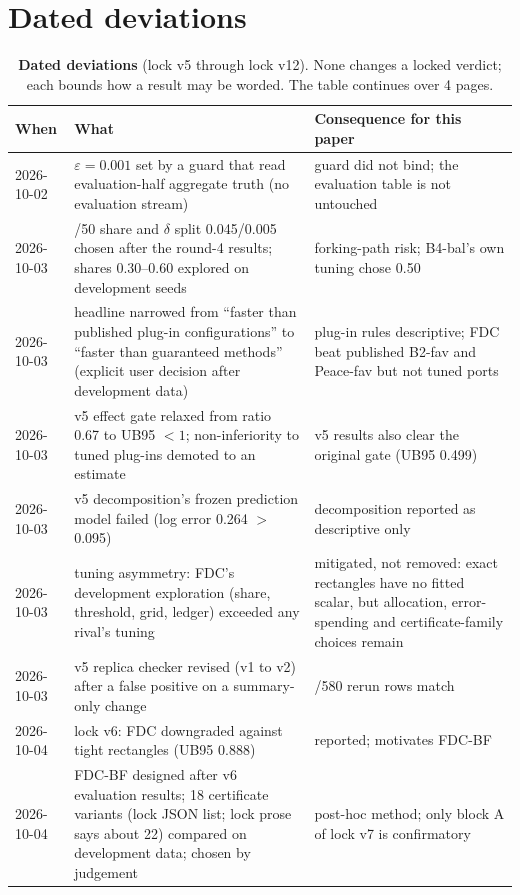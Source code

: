 \documentclass[sigconf,anonymous,review]{acmart}
\newcommand{\eps}{\varepsilon}
\begin{document}
\section{Dated deviations}\label{app:deviations}

\begin{table}[p]
\caption{\textbf{Dated deviations} (lock v5 through lock v12). None changes a locked verdict; each bounds how a result may be worded. The table continues over 4 pages.}
\label{tab:deviations}
\small
\begin{tabular}{@{}l>{\raggedright\arraybackslash}p{6.6cm}>{\raggedright\arraybackslash}p{7.6cm}@{}}
\toprule
When & What & Consequence for this paper \\
\midrule
2026-10-02 & $\eps = 0.001$ set by a guard that read evaluation-half aggregate truth (no evaluation stream) & guard did not bind; the evaluation table is not untouched \\
2026-10-03 & 50/50 share and $\delta$ split 0.045/0.005 chosen after the round-4 results; shares 0.30--0.60 explored on development seeds & forking-path risk; B4-bal's own tuning chose 0.50 \\
2026-10-03 & headline narrowed from ``faster than published plug-in configurations'' to ``faster than guaranteed methods'' (explicit user decision after development data) & plug-in rules descriptive; FDC beat published B2-fav and Peace-fav but not tuned ports \\
2026-10-03 & v5 effect gate relaxed from ratio 0.67 to UB95 $< 1$; non-inferiority to tuned plug-ins demoted to an estimate & v5 results also clear the original gate (UB95 0.499) \\
2026-10-03 & v5 decomposition's frozen prediction model failed (log error 0.264 $>$ 0.095) & decomposition reported as descriptive only \\
2026-10-03 & tuning asymmetry: FDC's development exploration (share, threshold, grid, ledger) exceeded any rival's tuning & mitigated, not removed: exact rectangles have no fitted scalar, but allocation, error-spending and certificate-family choices remain \\
2026-10-03 & v5 replica checker revised (v1 to v2) after a false positive on a summary-only change & 580/580 rerun rows match \\
2026-10-04 & lock v6: FDC downgraded against tight rectangles (UB95 0.888) & reported; motivates FDC-BF \\
2026-10-04 & FDC-BF designed after v6 evaluation results; 18 certificate variants (lock JSON list; lock prose says about 22) compared on development data; chosen by judgement & post-hoc method; only block A of lock v7 is confirmatory \\

\end{tabular}
\end{table}
\end{document}
